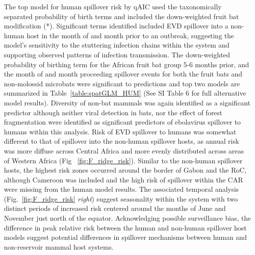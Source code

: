 \documentclass[a4paper,twoside, onecolumn]{article}
\begin{document}
	The top model for human spillover risk by qAIC used the taxonomically separated probability of birth terms and included the down-weighted fruit bat modification (*). Significant terms identified included EVD spillover into a non-human host in the month of and month prior to an outbreak, suggesting the model's sensitivity to the stuttering infection chains within the system and supporting observed patterns of infection transmission. The down-weighted probability of birthing term for the African fruit bat group 5-6 months prior, and the month of and month proceeding spillover events for both the fruit bats and non-molossid microbats were significant to predictions and top two models are summarized in Table~\ref{table:spatGLM_HUM} (See SI Table 6 for full alternative model results). Diversity of non-bat mammals was again identified as a significant predictor although neither viral detection in bats, nor the effect of forest fragmentation were identified as significant predictors of ebolavirus spillover to humans within this analysis. Risk of EVD spillover to humans was somewhat different to that of spillover into the non-human spillover hosts, as annual risk was more diffuse across Central Africa and more evenly distributed across areas of Western Africa (Fig ~\ref{fig:F_ridge_risk}). Similar to the non-human spillover hosts, the highest risk zones occurred around the border of Gabon and the RoC, although Cameroon was included and the high risk of spillover within the CAR were missing from the human model results. The associated temporal analysis (Fig.~\ref{fig:F_ridge_risk} \textit{right}) suggest seasonality within the system with two distinct periods of increased risk centered around the months of June and November just north of the equator. Acknowledging possible surveillance bias, the difference in peak relative risk between the human and non-human spillover host models suggest potential differences in spillover mechanisms between human and non-reservoir mammal host systems.\par
\end{document}
